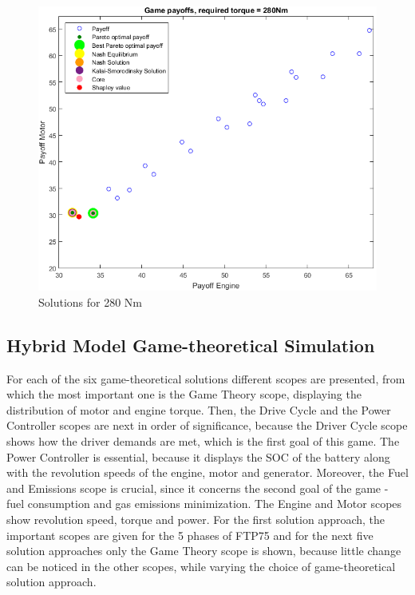 \begin{figure}[h]
  	\centering
	\includegraphics[scale=0.59]{figures/gametheory/280nm}
  	\caption{Solutions for 280 Nm}
  	\label{fig:280nm}
\end{figure}

\subsection{Hybrid Model Game-theoretical Simulation}

For each of the six game-theoretical solutions different scopes are presented, from which the most important one is the Game Theory scope, displaying the distribution of motor and engine torque. Then, the Drive Cycle and the Power Controller scopes are next in order of significance, because the Driver Cycle scope shows how the driver demands are met, which is the first goal of this game. The Power Controller is essential, because it displays the SOC of the battery along with the revolution speeds of the engine, motor and generator. Moreover, the Fuel and Emissions scope is crucial, since it concerns the second goal of the game - fuel consumption and gas emissions minimization. The Engine and Motor scopes show revolution speed, torque and power. For the first solution approach, the important scopes are given for the 5 phases of FTP75 and for the next five solution approaches only the Game Theory scope is shown, because little change can be noticed in the other scopes, while varying the choice of game-theoretical solution approach.

